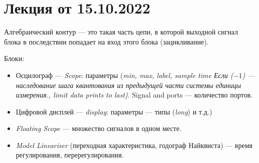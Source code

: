 \section{Лекция от 15.10.2022}
Алгебраический контур --- это такая часть цепи, в которой выходной сигнал блока
в последствии попадает на вход этого блока (зацикливание).\par
Блоки:
\begin{itemize}
  \item Осцилограф --- \textit{Scope}: параметры (\textit{min, max, label,
    sample time {\normalfont\ttfamily Если ($-1$) --- наследование шага
    квантования из предыдущей части системы единицы измерения.}, limit data
    prints to last)}. Signal and ports --- количество портов.
  \item Цифровой дисплей --- \textit{display}: параметры --- типы
    (\textit{long}) и т.д.)
  \item \textit{Floating Scope} --- множество сигналов в одном месте.
  \item \textit{Model Lineariser} (переходная характеристика, годограф
    Найквиста) --- время регулирования, перерегулирования.
\end{itemize}

